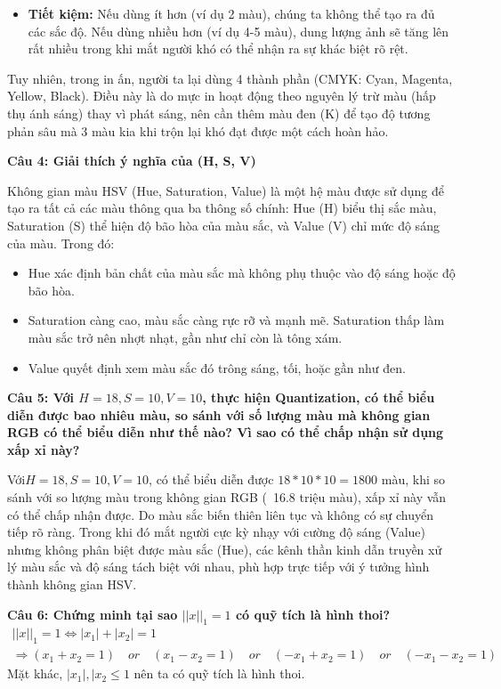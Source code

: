 \begin{enumerate}
\begin{itemize}
		\item \textbf{Tiết kiệm:} Nếu dùng ít hơn (ví dụ 2 màu), chúng ta không thể tạo ra đủ các sắc độ. Nếu dùng nhiều hơn (ví dụ 4-5 màu), dung lượng ảnh sẽ tăng lên rất nhiều trong khi mắt người khó có thể nhận ra sự khác biệt rõ rệt.
	\end{itemize}
	
	Tuy nhiên, trong in ấn, người ta lại dùng 4 thành phần (CMYK: Cyan, Magenta, Yellow, Black). Điều này là do mực in hoạt động theo nguyên lý trừ màu (hấp thụ ánh sáng) thay vì phát sáng, nên cần thêm màu đen (K) để tạo độ tương phản sâu mà 3 màu kia khi trộn lại khó đạt được một cách hoàn hảo.
\end{enumerate}

\textbf{Câu 4: Giải thích ý nghĩa của (H, S, V)}

Không gian màu HSV (Hue, Saturation, Value) là một hệ màu được sử dụng để tạo ra tất cả các màu thông qua ba thông số chính: Hue (H) biểu thị sắc màu, Saturation (S) thể hiện độ bão hòa của màu sắc, và Value (V) chỉ mức độ sáng của màu. Trong đó:

\begin{itemize}
	\item Hue xác định bản chất của màu sắc mà không phụ thuộc vào độ sáng hoặc độ bão hòa.
	
	\item Saturation càng cao, màu sắc càng rực rỡ và mạnh mẽ. Saturation thấp làm màu sắc trở nên nhợt nhạt, gần như chỉ còn là tông xám.
	
	\item Value quyết định xem màu sắc đó trông sáng, tối, hoặc gần như đen.
\end{itemize}

\textbf{Câu 5: Với $H = 18, S = 10, V = 10$, thực hiện Quantization, có thể biểu diễn được bao nhiêu màu, so sánh với số lượng màu mà không gian RGB có thể biểu diễn như thế nào? Vì sao có thể chấp nhận sử dụng xấp xỉ này?}

Với$ H = 18, S = 10, V = 10$, có thể biểu diễn được $18 * 10 * 10 = 1800$ màu, khi so sánh với so lượng màu trong không gian RGB (~16.8 triệu màu), xấp xỉ này vẫn có thể chấp nhận được. Do màu sắc biến thiên liên tục và không có sự chuyển tiếp rõ ràng. Trong khi đó mắt người cực kỳ nhạy với cường độ sáng (Value) nhưng không phân biệt được màu sắc (Hue), các kênh thần kinh dẫn truyền xử lý màu sắc và độ sáng tách biệt với nhau, phù hợp trực tiếp với ý tưởng hình thành không gian HSV.

\textbf{Câu 6: Chứng minh tại sao $||x||_1 = 1$ có quỹ tích là hình thoi?}
\begin{gather*}
	||x||_1 = 1 \Leftrightarrow |x_1| + |x_2| = 1 \\
	\Rightarrow (x_1 + x_2 = 1) \quad or \quad (x_1 - x_2 = 1) \quad or \quad (-x_1 + x_2 = 1) \quad or \quad (-x_1 - x_2 = 1)
\end{gather*}
Mặt khác, $|x_1|, |x_2 \le 1$ nên ta có quỹ tích là hình thoi.


